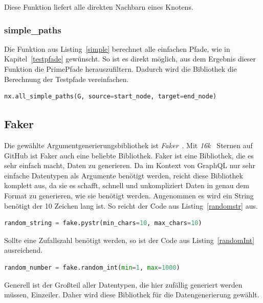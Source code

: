 Diese Funktion liefert alle direkten Nachbarn eines Knotens.

\subsubsection{simple\_paths}

Die Funktion aus Listing~\ref{simple} berechnet alle einfachen Pfade, wie in Kapitel~\ref{testpfade} gewünscht.
So ist es direkt möglich, aus dem Ergebnis dieser Funktion die PrimePfade herauszufiltern.
Dadurch wird die Bibliothek die Berechnung der Testpfade vereinfachen.

\begin{lstlisting}[language=Python, caption={Alle einfachen Pfade zwischen zwei Knoten}, label={simple}]
nx.all_simple_paths(G, source=start_node, target=end_node)
\end{lstlisting}

\subsection{Faker}
Die gewählte Argumentgenerierungsbibliothek ist \textit{Faker}~\cite{fakergithub}.
Mit \textit{16k}~\cite{fakergithub} Sternen auf GitHub ist Faker auch eine beliebte Bibliothek.
Faker ist eine Bibliothek, die es sehr einfach macht, Daten zu generieren.
Da im Kontext von GraphQL nur sehr einfache Datentypen als Argumente benötigt werden,
reicht diese Bibliothek komplett aus, da sie es schafft, schnell und unkompliziert Daten in genau dem Format zu generieren, wie sie benötigt werden.
Angenommen es wird ein String benötigt der 10 Zeichen lang ist.
So reicht der Code aus Listing~\ref{randomstr} aus.

\begin{lstlisting}[language=Python, caption={Ein zufälliger String}, label={randomstr}]
random_string = fake.pystr(min_chars=10, max_chars=10)
\end{lstlisting}

Sollte eine Zufallszahl benötigt werden, so ist der Code aus Listing~\ref{randomInt} ausreichend.

\begin{lstlisting}[language=Python, caption={Eine zufällige Zahl}, label={randomInt}]
random_number = fake.random_int(min=1, max=1000)
\end{lstlisting}

Generell ist der Großteil aller Datentypen, die hier zufällig generiert werden müssen, Einzeiler.
Daher wird diese Bibliothek für die Datengenerierung gewählt.

